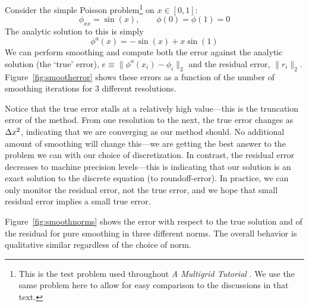 Consider the simple Poisson problem\footnote{This is the test problem
  used throughout {\em A Multigrid Tutorial} \cite{multigridtutorial}.
  We use the same problem here to allow for easy comparison to the
  discussions in that text.} on $x \in [0,1]$:
\begin{equation}
\phi_{xx} = \sin(x), \qquad \phi(0) = \phi(1) = 0
\end{equation}
The analytic solution to this is simply 
\begin{equation}
\phi^a(x) = -\sin(x) + x \sin(1)
\end{equation}
We can perform smoothing and compute both the error against the
analytic solution (the `true' error), $e \equiv \| \phi^a(x_i) - \phi_i \|_2$ and the
residual error, $\| r_i \|_2$.  Figure~\ref{fig:smootherror} shows these
errors as a function of the number of smoothing iterations for 3
different resolutions.

Notice that the true error stalls at a relatively high value---this is
the truncation error of the method.  From one resolution to the next,
the true error changes as $\Delta x^2$, indicating that we are
converging as our method should.  No additional amount of smoothing
will change this---we are getting the best answer to the problem we
can with our choice of discretization.
In contrast, the residual error decreases to machine precision
levels---this is indicating that our solution is an exact solution to
the discrete equation (to roundoff-error).
In practice, we can only monitor the residual error, not the true
error, and we hope that small residual error implies a small true
error.

Figure~\ref{fig:smoothnorms} shows the error with respect to the true
solution and of the residual for pure smoothing in three different
norms.  The overall behavior is qualitative similar regardless of the
choice of norm.

